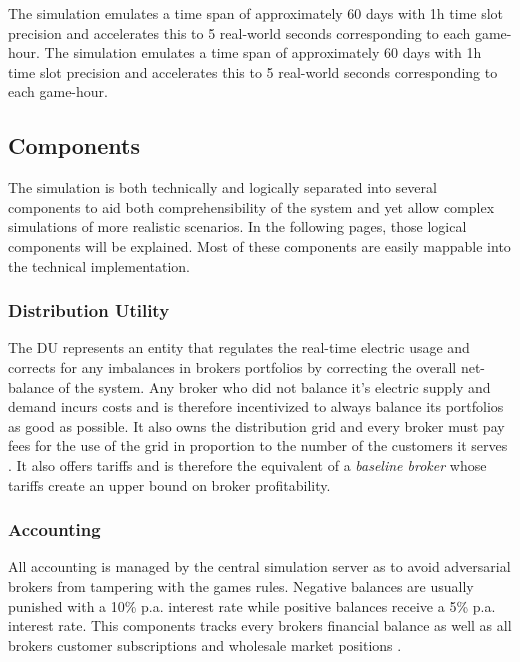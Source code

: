The simulation emulates a time span of approximately 60 days with 1h time slot precision and accelerates this to 5
real-world seconds corresponding to each game-hour. The simulation emulates a time span of approximately 60 days with 1h
time slot precision and accelerates this to 5 real-world seconds corresponding to each game-hour.

\subsection{Components}

The simulation is both technically and logically separated into several components to aid both comprehensibility of the
system and yet allow complex simulations of more realistic scenarios. In the following pages, those logical components
will be explained. Most of these components are easily mappable into the technical implementation.

\subsubsection{Distribution Utility} The \ac{DU} represents an entity that regulates the real-time electric usage and
corrects for any imbalances in brokers portfolios by correcting the overall net-balance of the system. Any broker who
did not balance it's electric supply and demand incurs costs and is therefore incentivized to always balance its
portfolios as good as possible. It also owns the distribution grid and every broker must pay fees for the use of the
grid in proportion to the number of the customers it serves \citep[p.10]{ketter2018powertac}. It also offers tariffs and
is therefore the equivalent of a \emph{baseline broker} whose tariffs create an upper bound on broker profitability.

\subsubsection{Accounting} All accounting is managed by the central simulation server as to avoid adversarial brokers
from tampering with the games rules. Negative balances are usually punished with a 10\% p.a. interest rate while
positive balances receive a 5\% p.a. interest rate. This components tracks every brokers financial balance as well as
all brokers customer subscriptions and wholesale market positions \citep[p.11]{ketter2018powertac}.

